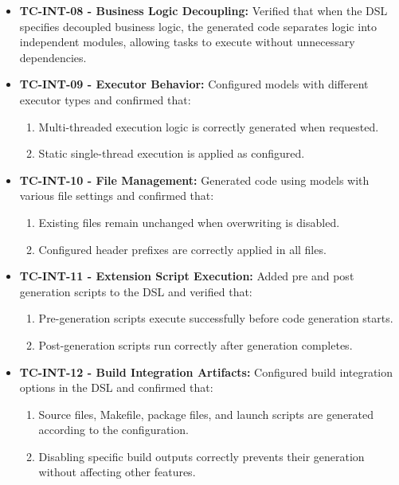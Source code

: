 \begin{itemize}
	\item \textbf{TC-INT-08 - Business Logic Decoupling:} Verified that when the DSL specifies decoupled business logic, the generated code separates logic into independent modules, allowing tasks to execute without unnecessary dependencies.
	
	\item \textbf{TC-INT-09 - Executor Behavior:} Configured models with different executor types and confirmed that:
	\begin{enumerate}
		\item Multi-threaded execution logic is correctly generated when requested.
		\item Static single-thread execution is applied as configured.
	\end{enumerate}
	
	\item \textbf{TC-INT-10 - File Management:} Generated code using models with various file settings and confirmed that:
	\begin{enumerate}
		\item Existing files remain unchanged when overwriting is disabled.
		\item Configured header prefixes are correctly applied in all files.
	\end{enumerate}
	
	\item \textbf{TC-INT-11 - Extension Script Execution:} Added pre and post generation scripts to the DSL and verified that:
	\begin{enumerate}
		\item Pre-generation scripts execute successfully before code generation starts.
		\item Post-generation scripts run correctly after generation completes.
	\end{enumerate}
	
	\item \textbf{TC-INT-12 - Build Integration Artifacts:} Configured build integration options in the DSL and confirmed that:
	\begin{enumerate}
		\item Source files, Makefile, package files, and launch scripts are generated according to the configuration.
		\item Disabling specific build outputs correctly prevents their generation without affecting other features.
	\end{enumerate}
	

\end{itemize}
